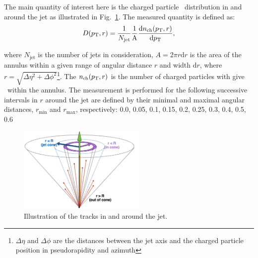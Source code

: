 
The main quantity of interest here is the charged particle \pt\ distribution in and around the jet as illustrated in Fig.~\ref{Fig:dpt_def}. The measured quantity is defined as:
  \begin{equation}
  \mbox{$D( p_{\mathrm{T}}, r)$} = \frac{1}{N_{\mathrm{jet}}} \frac{1}{\mathrm{A}} \frac{\mathrm{d} n_{\mathrm{ch}} (p_{\mathrm{T}}, r)}{\mathrm{d} p_{\mathrm{T}}},
\end{equation}

where $N_{\mathrm{jet}}$ is the number of jets in consideration, $A = 2\pi r \text{d}r$ is the area of the annulus within a given range of angular distance $r$ and width $\text{d}r$, where $r = \sqrt{\Delta \eta^2 + \Delta \phi^2}$\footnote{$\Delta \eta$ and $\Delta \phi$ are the distances between the jet axis and the charged particle position in pseudorapidity and azimuth}. The $n_{\mathrm{ch}}(p_{\mathrm{T}}, r)$ is the number of charged particles with give \pt\ within the annulus. The measurement is performed for the following successive intervals in $r$ around the jet are defined by their minimal and maximal angular distances, $r_{\textrm{min}}$ and $r_{\textrm{max}}$, respectively: 0.0, 0.05, 0.1, 0.15, 0.2, 0.25, 0.3, 0.4, 0.5, 0.6

\begin{figure}
\centerline{
\includegraphics[width=0.55\textwidth]{figures_general/fragScheme_Shape.pdf} }
\caption{Illustration of the tracks in and around the jet. }
\label{Fig:dpt_def}
\end{figure}


